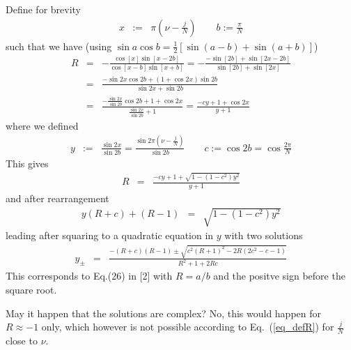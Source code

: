 \documentclass[english, parskip=full]{scrartcl}
\begin{document}
Define for brevity
\begin{eqnarray}
  x &:=& \pi(\nu - \frac{j}{N})
  \qquad
  b:= \frac{\pi}{N}
\end{eqnarray}
such that we have (using $\sin a \cos b = \frac12 [\sin(a-b) + \sin(a+b)]$)
\begin{eqnarray}
  R &=&
  - \frac{\cos[x] \sin[x-2b]}{\cos[x-b] \sin[x+b]}
  =
  - \frac{-\sin[2b] + \sin[2x-2b]}{\sin[2b] + \sin[2x]}
  \\
  &=&
  \frac{-\sin 2x \cos 2b  + (1+\cos 2x) \sin 2b }
       {\sin 2x  + \sin 2b}
  \\
  &=&
  \frac{-\frac{\sin 2x}{\sin 2b} \cos 2b  + 1+\cos 2x}
       {\frac{\sin 2x}{\sin 2b}+1}
  =
  \frac{-c y  + 1+\cos 2x}
       {y+1}
\end{eqnarray}
where we defined
\begin{eqnarray}
  \label{y_def}
  y &:=& \frac{\sin 2x}{\sin 2b} = \frac{\sin 2\pi(\nu - \frac{j}{N})}{\sin 2b}
  \qquad
  c:=\cos 2b = \cos \frac{2\pi}{N}
\end{eqnarray}
This gives
\begin{eqnarray}
  R &=&
  \frac{-c y  + 1 + \sqrt{1-(1-c^2)y^2}}{y  + 1}
  \label{eq_R}
\end{eqnarray}
and after rearrangement
\begin{eqnarray}
  y(R+c) + (R-1) &=&
  \sqrt{1-(1-c^2)y^2}
  \label{eq_Rsq}
\end{eqnarray}
leading after squaring to a quadratic equation in $y$ with two solutions
\begin{eqnarray}
  \label{eq_yofR}
  y_\pm &=&
  \frac{-(R+c)(R-1) \pm \sqrt{c^2(R+1)^2 - 2R(2c^2-c-1)}}
       {R^2 + 1 + 2Rc}
\end{eqnarray}
This corresponds to Eq.(26) in [2] with $R=a/b$ and the positve sign before the square root.

May it happen that the solutions are complex? No, this would happen for $R \approx -1$ only,
which however is not possible according to Eq.~(\ref{eq_defR}) for $\frac jN$ close to $\nu$.
\end{document}
